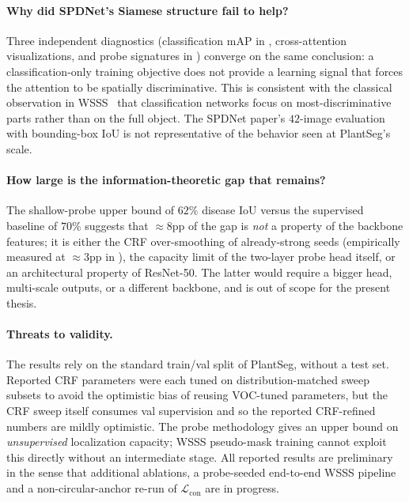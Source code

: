 \documentclass[11pt,a4paper]{article}
\newcommand{\Lcon}{\mathcal{L}_{\mathrm{con}}}
\begin{document}
\paragraph{Why did SPDNet's Siamese structure fail to help?}
Three independent diagnostics (classification mAP in ,
cross-attention visualizations, and probe signatures in
) converge on the same conclusion: a classification-only
training objective does not provide a learning signal that forces the
attention to be spatially discriminative. This is consistent with the
classical observation in WSSS~\citep{sec,affinitynet} that
classification networks focus on most-discriminative parts rather than
on the full object. The SPDNet paper's $42$-image evaluation
\citep{spdnet} with bounding-box IoU is not representative of the
behavior seen at PlantSeg's scale.

\paragraph{How large is the information-theoretic gap that remains?}
The shallow-probe upper bound of $62\%$ disease IoU versus the
supervised baseline of $70\%$ suggests that ${\approx}8$pp of the gap is
\emph{not} a property of the backbone features; it is either the CRF
over-smoothing of already-strong seeds (empirically measured at
${\approx}3$pp in ), the capacity limit of the
two-layer probe head itself, or an architectural property of ResNet-50.
The latter would require a bigger head, multi-scale outputs, or a
different backbone, and is out of scope for the present thesis.

\paragraph{Threats to validity.}
The results rely on the standard train/val split of PlantSeg,
without a test set. Reported CRF parameters were each tuned on
distribution-matched sweep subsets to avoid the optimistic bias of
reusing VOC-tuned parameters, but the CRF sweep itself consumes val
supervision and so the reported CRF-refined numbers are mildly
optimistic. The probe methodology gives an upper bound on
\emph{unsupervised} localization capacity; WSSS pseudo-mask training
cannot exploit this directly without an intermediate stage. All
reported results are preliminary in the sense that additional
ablations, a probe-seeded end-to-end WSSS pipeline and a
non-circular-anchor re-run of $\Lcon$ are in progress.
\end{document}
